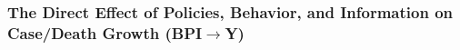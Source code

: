 \documentclass{beamer}
\renewcommand{\to}{{\rightarrow}}
\begin{document}
\begin{frame}
  \frametitle{The Direct Effect of Policies, Behavior, and Information on Case/Death Growth (BPI$\to$Y)}



\begin{table}[!htbp] \centering
 \label{tab:BPItoY}
 \begin{minipage}{\linewidth}
   \centering
 \end{minipage}
\end{table}

\end{frame}



\end{document}
